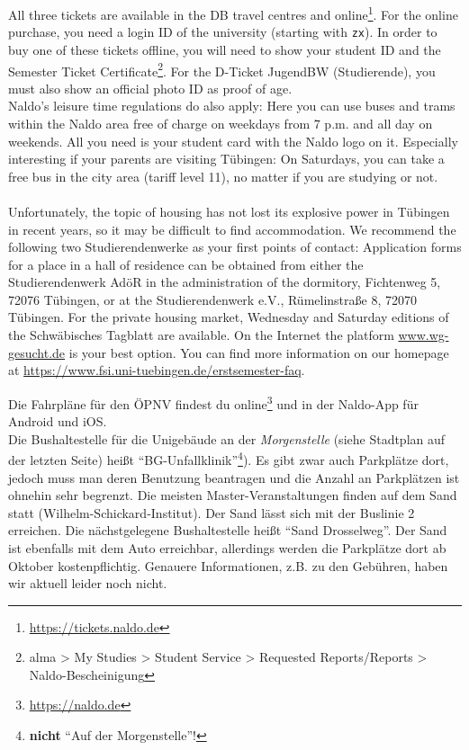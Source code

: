     All three tickets are available in the DB travel centres and online\footnote{\url{https://tickets.naldo.de}}. For the online purchase, you need a login ID of the university (starting with \texttt{zx}).
    In order to buy one of these tickets offline, you will need to show your student ID and the Semester Ticket Certificate\footnote{alma > My Studies > Student Service > Requested Reports/Reports > Naldo-Bescheinigung}. For the D-Ticket JugendBW (Studierende), you must also show an official photo ID as proof of age.\\
    
    Naldo's leisure time regulations do also apply: Here you can use buses and trams within the Naldo area free of charge on weekdays from 7 p.m. and all day on weekends. All you need is your student card with the Naldo logo on it.
    Especially interesting if your parents are visiting Tübingen: On Saturdays, you can take a free bus in the city area (tariff level 11), no matter if you are studying or not.\\ \\

    Unfortunately, the topic of housing has not lost its explosive power in Tübingen in recent years,
    so it may be difficult to find accommodation. We recommend the following two Studierendenwerke as your first points of contact:
    Application forms for a place in a hall of residence can be obtained from either the Studierendenwerk AdöR in the administration of the dormitory,
    Fichtenweg 5, 72076 Tübingen, or at the Studierendenwerk e.V., Rümelinstraße 8, 72070 Tübingen. For the private housing market, Wednesday and Saturday
    editions of the Schwäbisches Tagblatt are available.
    On the Internet the platform \url{www.wg-gesucht.de} is your best option.
    You can find more information on our homepage at \url{https://www.fsi.uni-tuebingen.de/erstsemester-faq}.

\else

    Die Fahrpläne für den ÖPNV  findest du online\footnote{\url{https://naldo.de}} und in der Naldo-App für Android und iOS.\\
    Die Bushaltestelle für die Unigebäude an der \emph{Morgenstelle} (siehe Stadtplan auf der letzten Seite) heißt "`BG-Unfallklinik"'\footnote{\textbf{nicht} "`Auf der Morgenstelle"'!}). Es gibt zwar auch Parkplätze dort,
    jedoch muss man deren Benutzung beantragen und die Anzahl an Parkplätzen ist ohnehin sehr begrenzt.
    \ifmaster
    Die meisten Master-Veranstaltungen finden auf dem Sand statt (Wilhelm-Schickard-Institut). Der Sand lässt sich mit der Buslinie 2 erreichen. Die nächstgelegene Bushaltestelle heißt "`Sand Drosselweg"'. Der Sand ist ebenfalls mit dem Auto erreichbar, allerdings werden die Parkplätze dort ab Oktober kostenpflichtig. Genauere Informationen, z.B. zu den Gebühren, haben wir aktuell leider noch nicht.    \fi
    
